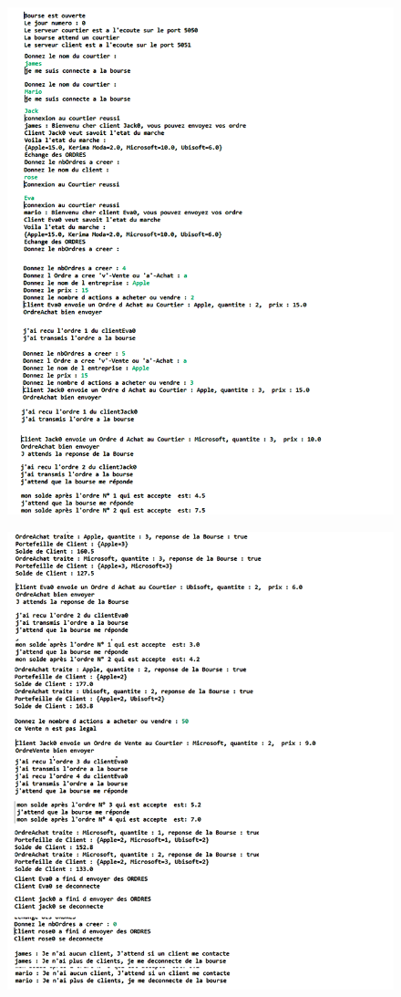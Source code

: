 \documentclass[11pt]{article}
\begin{document}
\begin{figure}[!htb]
  \centering
    \includegraphics[width=\textwidth]{screen1.png}
\end{figure}

\begin{figure}[!htb]
  \centering
    \includegraphics[width=\textwidth]{screen2.png}
\end{figure}
\end{document}
